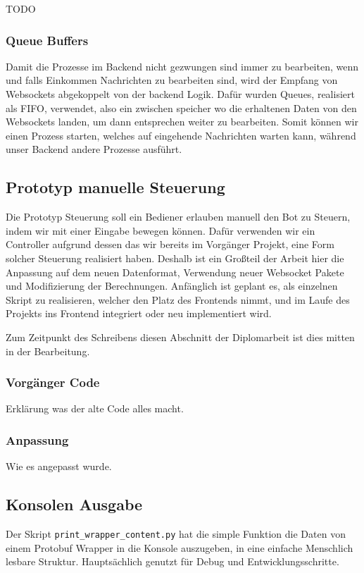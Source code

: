 TODO

\subsubsection{Queue Buffers}
Damit die Prozesse im Backend nicht gezwungen sind immer zu bearbeiten, 
wenn und falls Einkommen Nachrichten zu bearbeiten sind, 
wird der Empfang von Websockets abgekoppelt von der backend Logik.
Dafür wurden Queues, realisiert als FIFO, verwendet, also ein zwischen speicher 
wo die erhaltenen Daten von den Websockets landen, 
um dann entsprechen weiter zu bearbeiten.
% 
Somit können wir einen Prozess starten, welches auf eingehende Nachrichten warten kann,
während unser Backend andere Prozesse ausführt.

\subsection{Prototyp manuelle Steuerung}
Die Prototyp Steuerung soll ein Bediener erlauben manuell den Bot zu Steuern,
indem wir mit einer Eingabe bewegen können. 
% 
Dafür verwenden wir ein Controller 
aufgrund dessen das wir bereits im Vorgänger Projekt,
eine Form solcher Steuerung realisiert haben. 
Deshalb ist ein Großteil der Arbeit hier die Anpassung auf dem neuen Datenformat, 
Verwendung neuer Websocket Pakete und Modifizierung der Berechnungen.
% 
Anfänglich ist geplant es, als einzelnen Skript zu realisieren, 
welcher den Platz des Frontends nimmt, 
und im Laufe des Projekts ins Frontend integriert oder neu implementiert wird.

Zum Zeitpunkt des Schreibens diesen Abschnitt der Diplomarbeit 
ist dies mitten in der Bearbeitung.
\subsubsection{Vorgänger Code}
Erklärung was der alte Code alles macht.
\subsubsection{Anpassung}
Wie es angepasst wurde.

\subsection{Konsolen Ausgabe}
Der Skript \texttt{print\_wrapper\_content.py} hat die simple Funktion 
die Daten von einem Protobuf Wrapper in die Konsole auszugeben, 
in eine einfache Menschlich lesbare Struktur. 
Hauptsächlich genutzt für Debug und Entwicklungsschritte.

